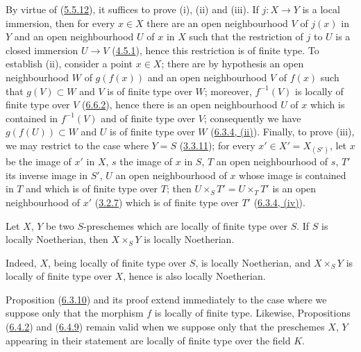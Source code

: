 By virtue of (\hyperref[I.5.5.12]{5.5.12}), it suffices to prove (i), (ii)
and (iii). If $j:X\to Y$ is a local immersion, then for every $x\in X$ there
are an open neighbourhood $V$ of $j(x)$ in $Y$ and an open neighbourhood $U$ of
$x$ in $X$ such that the restriction of $j$ to $U$ is a closed immersion
$U\to V$ (\hyperref[I.4.5.1]{4.5.1}), hence this restriction is of finite
type. To establish (ii), consider a point $x\in X$; there are by hypothesis an
open neighbourhood $W$ of $g(f(x))$ and an open neighbourhood $V$ of $f(x)$
such that $g(V)\subset W$ and $V$ is of finite type over $W$; moreover,
$f^{-1}(V)$ is locally of finite type over $V$
(\hyperref[I.6.6.2]{6.6.2}), hence there is an open neighbourhood $U$ of
$x$ which
is contained in $f^{-1}(V)$ and of finite type over $V$; consequently we have
$g(f(U))\subset W$ and $U$ is of finite type over $W$
(\hyperref[I.6.3.4]{6.3.4, (ii)}). Finally, to prove (iii), we may
restrict to the case where $Y=S$ (\hyperref[I.3.3.11]{3.3.11}); for every
$x'\in X'=X_{(S')}$, let $x$ be the image of $x'$ in $X$, $s$ the image of $x$
in $S$, $T$ an open neighbourhood of $s$, $T'$ its inverse image in $S'$,
$U$ an open neighbourhood of $x$ whose image is contained in $T$ and which is
of finite type over $T$; then $U\times_S T'=U\times_T T'$ is an open
neighbourhood of $x'$ (\hyperref[I.3.2.7]{3.2.7}) which is of finite type
over $T'$ (\hyperref[I.6.3.4]{6.3.4, (iv)}).

\begin{corollary}[6.6.7]
\label{I.6.6.7}
Let $X$, $Y$ be two $S$-preschemes which are locally of finite type over $S$.
If $S$ is locally Noetherian, then $X\times_S Y$ is locally Noetherian.
\end{corollary}

Indeed, $X$, being locally of finite type over $S$, is locally Noetherian, and
$X\times_S Y$ is locally of finite type over $X$, hence is also locally
Noetherian.

\begin{remark}[6.6.8]
\label{I.6.6.8}
Proposition (\hyperref[I.6.3.10]{6.3.10}) and its proof extend immediately
to the case where we suppose only that the morphism $f$ is locally of finite
type. Likewise, Propositions
(\hyperref[I.6.4.2]{6.4.2}) and (\hyperref[I.6.4.9]{6.4.9}) remain
valid when we suppose only that the preschemes $X$, $Y$ appearing in their
statement are locally of finite type over the field $K$.
\end{remark}
